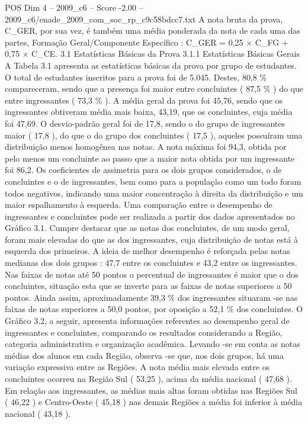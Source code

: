 \begin{textsample}{POS Dim 4 – 2009\_c6 – Score -2.00 – 2009\_c6/enade\_2009\_com\_soc\_rp\_c9c58bdcc7.txt}
A nota bruta da prova, C\_GER, por sua vez, é também uma média ponderada da nota de cada uma das partes, Formação Geral/Componente Específico : C\_GER = 0,25 × C\_FG + 0,75 × C\_CE. 3.1 Estatísticas Básicas da Prova 3.1.1 Estatísticas Básicas Gerais A Tabela 3.1 apresenta as estatísticas básicas da prova por grupo de estudantes.
O total de estudantes inscritos para a prova foi de 5.045.
Destes, 80,8 \% compareceram, sendo que a presença foi maior entre concluintes ( 87,5 \% ) do que entre ingressantes ( 73,3 \% ).
A média geral da prova foi 45,76, sendo que os ingressantes obtiveram média mais baixa, 43,19, que os concluintes, cuja média foi 47,69.
O desvio-padrão geral foi de 17,8, sendo o do grupo de ingressantes maior ( 17,8 ), do que o do grupo dos concluintes ( 17,5 ), aqueles possuíram uma distribuição menos homogênea nas notas.
A nota máxima foi 94,3, obtida por pelo menos um concluinte ao passo que a maior nota obtida por um ingressante foi 86,2.
Os coeficientes de assimetria para os dois grupos considerados, o de concluintes e o de ingressantes, bem como para a população como um todo foram todos negativos, indicando uma maior concentração à direita da distribuição e um maior espalhamento à esquerda.
Uma comparação entre o desempenho de ingressantes e concluintes pode ser realizada a partir dos dados apresentados no Gráfico 3.1.
Cumpre destacar que as notas dos concluintes, de um modo geral, foram mais elevadas do que as dos ingressantes, cuja distribuição de notas está à esquerda dos primeiros.
A ideia de melhor desempenho é reforçada pelas notas medianas dos dois grupos : 47,7 entre os concluintes e 43,2 entre os ingressantes.
Nas faixas de notas até 50 pontos o percentual de ingressantes é maior que o dos concluintes, situação esta que se inverte para as faixas de notas superiores a 50 pontos.
Ainda assim, aproximadamente 39,3 \% dos ingressantes situaram -se nas faixas de notas superiores a 50,0 pontos, por oposição a 52,1 \% dos concluintes.
O Gráfico 3.2, a seguir, apresenta informações referentes ao desempenho geral de ingressantes e concluintes, comparando os resultados considerando a Região, categoria administrativa e organização acadêmica.
Levando -se em conta as notas médias dos alunos em cada Região, observa -se que, nos dois grupos, há uma variação expressiva entre as Regiões.
A nota média mais elevada entre os concluintes ocorreu na Região Sul ( 53,25 ), acima da média nacional ( 47,68 ).
Em relação aos ingressantes, as médias mais altas foram obtidas nas Regiões Sul ( 46,22 ) e Centro-Oeste ( 45,18 ) nas demais Regiões a média foi inferior à média nacional ( 43,18 ).

\end{textsample}
